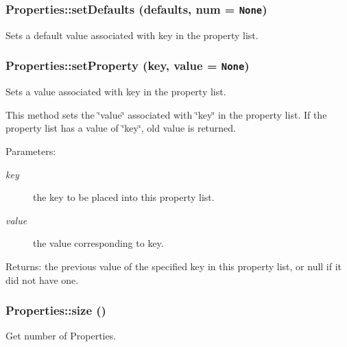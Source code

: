 \subsubsection{\setlength{\rightskip}{0pt plus 5cm}Properties::set\-Defaults (defaults, num = {\tt None})}\label{classProperties_Propertiesa12}


Sets a default value associated with key in the property list. 

\subsubsection{\setlength{\rightskip}{0pt plus 5cm}Properties::set\-Property (key, value = {\tt None})}\label{classProperties_Propertiesa10}


Sets a value associated with key in the property list. 

This method sets the \char`\"{}value\char`\"{} associated with \char`\"{}key\char`\"{} in the property list. If the property list has a value of \char`\"{}key\char`\"{}, old value is returned.

\begin{Desc}
\item[Parameters:]
\begin{description}
\item[{\em key}]the key to be placed into this property list. \item[{\em value}]the value corresponding to key. \end{description}
\end{Desc}
\begin{Desc}
\item[Returns:]the previous value of the specified key in this property list, or null if it did not have one.\end{Desc}
\subsubsection{\setlength{\rightskip}{0pt plus 5cm}Properties::size ()}\label{classProperties_Propertiesa18}


Get number of Properties. 

